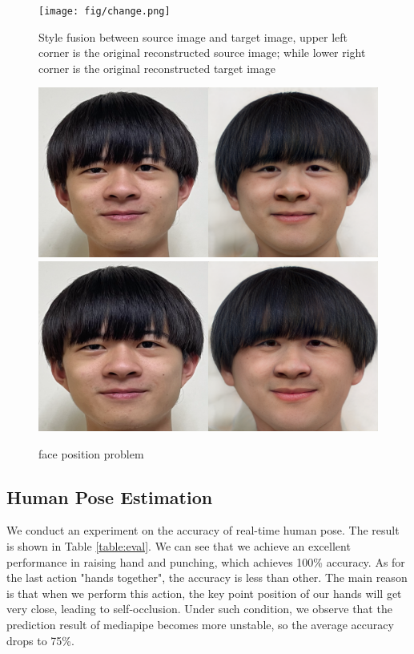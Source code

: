 \begin{figure}[ht]
\centering
    \centering
    \texttt{[image: fig/change.png]}
    \caption{Style fusion between source image and target image, upper left corner is the original reconstructed source image; while lower right corner is the original reconstructed target image}
    \label{fig:stylechange}
\end{figure}

\begin{figure}
  \centering
  \includegraphics[scale=0.05]{fig/couple_result.png}
  \hspace{1in}
  \includegraphics[scale=0.05]{fig/couple_result_cmp.png}
  \caption{face position problem}
  \label{fig:face position problem}
\end{figure}

\subsection{Human Pose Estimation}

We conduct an experiment on the accuracy of real-time human pose. The result is shown in Table \ref{table:eval}. We can see that we achieve an excellent performance in raising hand and punching, which achieves 100\% accuracy. As for the last action "hands together", the accuracy is less than other. The main reason is that when we perform this action, the key point position of our hands will get very close, leading to self-occlusion. Under such condition, we observe that the prediction result of mediapipe becomes more unstable, so the average accuracy drops to 75\%.

